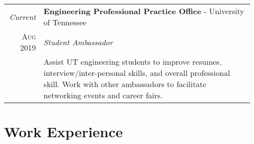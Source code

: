 \documentclass[a4paper,11pt]{article}
\begin{document}
\begin{tabularx}{\textwidth}{r|X}

   \emph{Current} & \textbf{Engineering Professional Practice Office} \-- University of Tennessee\\
   \textsc{Aug 2019} & \emph{Student Ambassador}\\
   & \small{Assist UT engineering students to improve resumes, interview/inter-personal skills, and overall professional skill.
            Work with other ambassadors to facilitate networking events and career fairs.
   }\\


\end{tabularx}

\section{Work Experience}
\end{document}
